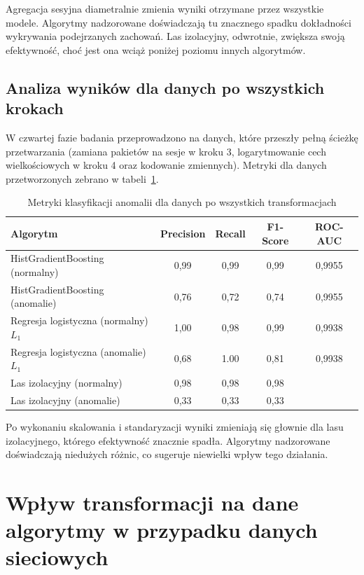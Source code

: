\documentclass[12pt,twoside]{article}
\begin{document}
Agregacja sesyjna diametralnie zmienia wyniki otrzymane przez wszystkie modele.
Algorytmy nadzorowane doświadczają tu znacznego spadku dokładności wykrywania podejrzanych zachowań.
Las izolacyjny, odwrotnie, zwiększa swoją efektywność, choć jest ona wciąż poniżej poziomu innych algorytmów.

\subsection{Analiza wyników dla danych po wszystkich krokach}

W czwartej fazie badania przeprowadzono na danych, które przeszły pełną ścieżkę przetwarzania (zamiana pakietów na sesje w kroku 3, logarytmowanie cech wielkościowych w kroku 4 oraz kodowanie zmiennych). 
Metryki dla danych przetworzonych zebrano w tabeli~\ref{Tab:Wyniki4}.

\begin{table}[ht]
\caption{Metryki klasyfikacji anomalii dla danych po wszystkich transformacjach}
\centering		
	\begin{tabular}{|l|c|c|c|c|}	
		\hline
		Algorytm & Precision & Recall & F1-Score & ROC-AUC \\
		\hline
		HistGradientBoosting (normalny) & 0,99 & 0,99 & 0,99 & 0,9955 \\
		HistGradientBoosting (anomalie) & 0,76 & 0,72 & 0,74 & 0,9955 \\
		Regresja logistyczna (normalny) $L_1$ & 1,00 & 0,98 & 0,99 & 0,9938 \\
		Regresja logistyczna (anomalie) $L_1$ & 0,68 & 1.00 & 0,81 & 0,9938 \\
		Las izolacyjny (normalny) & 0,98 & 0,98 & 0,98 & \\
		Las izolacyjny (anomalie) & 0,33 & 0,33 & 0,33 & \\
		\hline
	\end{tabular}	
\label{Tab:Wyniki4}
\end{table}

Po wykonaniu skalowania i standaryzacji wyniki zmieniają się głownie dla lasu izolacyjnego, którego efektywność znacznie spadła.
Algorytmy nadzorowane doświadczają niedużych różnic, co sugeruje niewielki wpływ tego działania.

\section{Wpływ transformacji na dane algorytmy w przypadku danych sieciowych}
\end{document}
